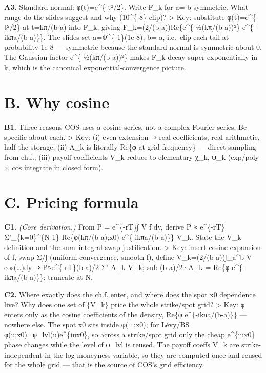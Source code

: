 \documentclass[
  11pt,
]{article}
\begin{document}
\textbf{A3.} Standard normal: φ(t)=e\^{}\{-t²/2\}. Write F\_k for a=-b
symmetric. What range do the slides suggest and why (10\^{}\{-8\} clip)?
\textgreater{} Key: substitute φ(t)=e\^{}\{-t²/2\} at t=kπ/(b-a) into
F\_k, giving F\_k=(2/(b-a))Re\{e\^{}\{-½(kπ/(b-a))²\}
e\^{}\{-ikπa/(b-a)\}\}. The slides set a=Φ\^{}\{-1\}(1e-8), b=-a,
i.e.~clip each tail at probability 1e-8 --- symmetric because the
standard normal is symmetric about 0. The Gaussian factor
e\^{}\{-½(kπ/(b-a))²\} makes F\_k decay super-exponentially in k, which
is the canonical exponential-convergence picture.

\hypertarget{b.-why-cosine}{%
\section{B. Why cosine}\label{b.-why-cosine}}

\textbf{B1.} Three reasons COS uses a cosine series, not a complex
Fourier series. Be specific about each. \textgreater{} Key: (i) even
extension ⇒ real coefficients, real arithmetic, half the storage; (ii)
A\_k is literally Re\{φ at grid frequency\} --- direct sampling from
ch.f.; (iii) payoff coefficients V\_k reduce to elementary χ\_k, ψ\_k
(exp/poly × cos integrate in closed form).

\hypertarget{c.-pricing-formula}{%
\section{C. Pricing formula}\label{c.-pricing-formula}}

\textbf{C1.} \emph{(Core derivation.)} From P = e\^{}\{-rT\}∫ V f dy,
derive P ≈ e\^{}\{-rT\} Σ'\_\{k=0\}\^{}\{N-1\} Re\{φ(kπ/(b-a);x0)
e\^{}\{-ikπa/(b-a)\}\} V\_k. State the V\_k definition and the
sum--integral swap justification. \textgreater{} Key: insert cosine
expansion of f, swap Σ/∫ (uniform convergence, smooth f), define
V\_k=(2/(b-a))∫\_a\^{}b V cos(\ldots)dy ⇒ P≈e\^{}\{-rT\}(b-a)/2 Σ' A\_k
V\_k; sub (b-a)/2·A\_k = Re\{φ e\^{}\{-ikπa/(b-a)\}\}; truncate at N.

\textbf{C2.} Where exactly does the ch.f. enter, and where does the spot
x0 dependence live? Why does one set of \{V\_k\} price the whole
strike/spot grid? \textgreater{} Key: φ enters only as the cosine
coefficients of the density, Re\{φ e\^{}\{-ikπa/(b-a)\}\} --- nowhere
else. The spot x0 sits inside φ(·;x0); for Lévy/BS
φ(u;x0)=φ\_lvl(u)e\^{}\{iux0\}, so across a strike/spot grid only the
cheap e\^{}\{iux0\} phase changes while the level cf φ\_lvl is reused.
The payoff coeffs V\_k are strike-independent in the log-moneyness
variable, so they are computed once and reused for the whole grid ---
that is the source of COS's grid efficiency.
\end{document}
